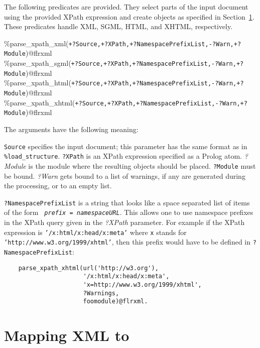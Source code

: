 The following predicates are provided. They select parts of the input
document using the provided XPath expression and create \FLORA objects as
specified in Section~\ref{xml-to-flora}. These predicates handle XML, SGML,
HTML, and XHTML, respectively.

\begin{description}
\item[\%parse\_xpath\_xml({\tt +?Source,+?XPath,+?NamespacePrefixList,-?Warn,+?Module})@flrxml]
\item[\%parse\_xpath\_sgml({\tt +?Source,+?XPath,+?NamespacePrefixList,-?Warn,+?Module})@flrxml]
\item[\%parse\_xpath\_html({\tt +?Source,+?XPath,+?NamespacePrefixList,-?Warn,+?Module})@flrxml]
\item[\%parse\_xpath\_xhtml({\tt +?Source,+?XPath,+?NamespacePrefixList,-?Warn,+?Module})@flrxml]
\end{description}
The arguments have the following meaning:

{\tt Source} specifies the input document; this parameter has the same
format as in {\tt \%load\_structure}. {\tt ?XPath} is an XPath expression
specified as a Prolog atom. \emph{?Module} is the module where the resulting
\FLORA objects should be placed. {\tt ?Module} must be bound. \emph{?Warn}
gets bound to a list of warnings, if any are generated during the
processing, or to an empty list.

{\tt ?NamespacePrefixList} is a string that looks like a
space separated list of items of the form {\tt
  \emph{prefix} = \emph{namespaceURL}}. This allows one to use namespace
prefixes in the
XPath query given in the \emph{?XPath} parameter.
For example if the XPath expression is {\tt '/x:html/x:head/x:meta'}
where {\tt x} 
stands for {\tt 'http://www.w3.org/1999/xhtml'}, then this
prefix would have to be
defined in {\tt ?NamespacePrefixList}:

\begin{verbatim}	
    parse_xpath_xhtml(url('http://w3.org'),
                      '/x:html/x:head/x:meta',
                      'x=http://www.w3.org/1999/xhtml',
                      ?Warnings,
                      foomodule)@flrxml.
\end{verbatim}



\section{Mapping XML to \FLORA}\label{xml-to-flora}

